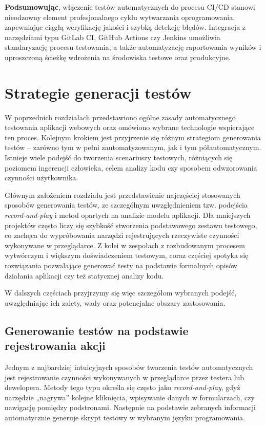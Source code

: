 \documentclass[12pt]{report}
\begin{document}
\bigskip
\noindent
\textbf{Podsumowując}, włączenie testów automatycznych do procesu CI/CD stanowi nieodzowny element profesjonalnego cyklu wytwarzania oprogramowania, zapewniając ciągłą weryfikację jakości i szybką detekcję błędów. Integracja z narzędziami typu GitLab CI, GitHub Actions czy Jenkins umożliwia standaryzację procesu testowania, a także automatyzację raportowania wyników i uproszczoną ścieżkę wdrożenia na środowiska testowe oraz produkcyjne.

\chapter{Strategie generacji testów}
\label{chap:strategie-generacji}
W poprzednich rozdziałach przedstawiono ogólne zasady automatycznego testowania aplikacji webowych oraz omówiono wybrane technologie wspierające ten proces. Kolejnym krokiem jest przyjrzenie się różnym strategiom generowania testów – zarówno tym w pełni zautomatyzowanym, jak i tym półautomatycznym. Istnieje wiele podejść do tworzenia scenariuszy testowych, różniących się poziomem ingerencji człowieka, celem analizy kodu czy sposobem odwzorowania czynności użytkownika.

Głównym założeniem rozdziału jest przedstawienie najczęściej stosowanych sposobów generowania testów, ze szczególnym uwzględnieniem tzw. podejścia \emph{record-and-play} i metod opartych na analizie modelu aplikacji. Dla mniejszych projektów często liczy się szybkość stworzenia podstawowego zestawu testowego, co zachęca do wypróbowania narzędzi rejestrujących rzeczywiste czynności wykonywane w przeglądarce. Z kolei w zespołach z rozbudowanym procesem wytwórczym i większym doświadczeniem testowym, coraz częściej spotyka się rozwiązania pozwalające generować testy na podstawie formalnych opisów działania aplikacji czy też statycznej analizy kodu.

W dalszych częściach przyjrzymy się więc szczegółom wybranych podejść, uwzględniając ich zalety, wady oraz potencjalne obszary zastosowania.

\section{Generowanie testów na podstawie rejestrowania akcji}
\label{sec:rejestrowanie-akcji}
Jednym z najbardziej intuicyjnych sposobów tworzenia testów automatycznych jest rejestrowanie czynności wykonywanych w przeglądarce przez testera lub dewelopera. Metody tego typu określa się często jako \emph{record-and-play}, gdyż narzędzie „nagrywa” kolejne kliknięcia, wpisywanie danych w formularzach, czy nawigację pomiędzy podstronami. Następnie na podstawie zebranych informacji automatycznie generuje skrypt testowy w wybranym języku programowania.
\end{document}
